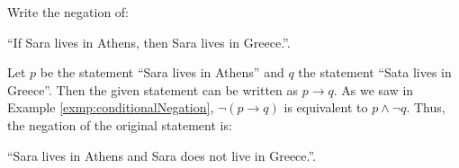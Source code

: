 \guard





\begin{exmp}
\label{exmp:conditionalStatementNegationTranslation}
  Write the negation of:
  \begin{center}
    ``If Sara lives in Athens, then Sara lives in Greece.''.
  \end{center}

  Let $p$ be the statement ``Sara lives in Athens'' and $q$ the statement ``Sata lives in Greece''.
  Then the given statement can be written as $p \rightarrow q$.
  As we saw in Example \ref{exmp:conditionalNegation}, $\neg(p\rightarrow q)$ is equivalent to $p\wedge\neg q$.
  Thus, the negation of the original statement is:
  \begin{center}
    ``Sara lives in Athens and Sara does not live in Greece.''.
  \end{center}
\end{exmp}
